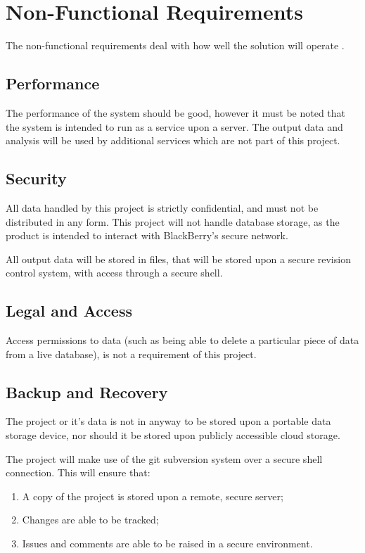 \section{Non-Functional Requirements}
The non-functional requirements deal with how well the solution will operate 
\citep{cadle10}. 

\subsection{Performance}
The performance of the system should be good, however it must be noted that the
system is intended to run as a service upon a server. The output data and 
analysis will be used by additional services which are not part of this 
project.

\subsection{Security}
All data handled by this project is strictly confidential, and must not be 
distributed in any form. This project will not handle database storage, as the
product is intended to interact with BlackBerry's secure network. 

All output data will be stored in files, that will be stored upon a secure 
revision control system, with access through a secure shell.

\subsection{Legal and Access}
Access permissions to data (such as being able to delete a particular piece of 
data from a live database), is not a requirement of this project.

\subsection{Backup and Recovery}
The project or it's data is not in anyway to be stored upon a portable data 
storage device, nor should it be stored upon publicly accessible cloud storage.

The project will make use of the git subversion system over a secure shell 
connection. This will ensure that:
\begin{enumerate}
  \item A copy of the project is stored upon a remote, secure server;
  \item Changes are able to be tracked;
  \item Issues and comments are able to be raised in a secure environment.
\end{enumerate}

